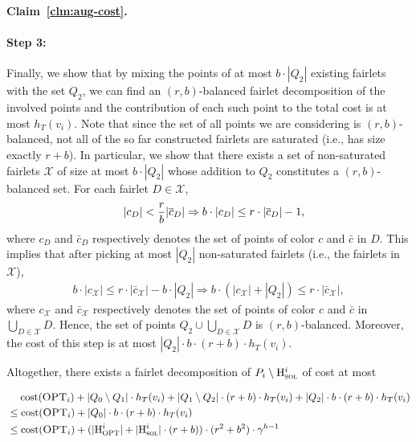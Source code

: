 \begin{proofof}{\bf Claim~\ref{clm:aug-cost}.}
\paragraph{Step 3:} Finally, we show that by mixing the points of at most $b\cdot|Q_2|$ existing fairlets with the set $Q_2$, we can find an $(r,b)$-balanced fairlet decomposition of the involved points and the contribution of each such point to the total cost is at most $h_T(v_i)$. Note that since the set of all points we are considering is $(r,b)$-balanced, not all of the so far constructed fairlets are saturated (i.e., has size exactly $r+b$). In particular, we show that there exists a set of non-saturated fairlets $\mathcal{X}$ of size at most $b\cdot |Q_2|$ whose addition to $Q_2$ constitutes a $(r,b)$-balanced set. For each fairlet $D\in \mathcal{X}$, 
\begin{align*}
\quad |c_{D}| < {r\over b} |\bar{c}_D|\Rightarrow b\cdot |c_D| \leq r\cdot |\bar{c}_D| - 1,
\end{align*}
where $c_D$ and $\bar{c}_D$ respectively denotes the set of points of color $c$ and $\bar{c}$ in $D$.
This implies that after picking at most $|Q_2|$ non-saturated fairlets (i.e., the fairlets in $\mathcal{X}$),
\begin{align*}
b\cdot |c_{\mathcal{X}}| \leq r\cdot |\bar{c}_{\mathcal{X}}| - b\cdot |Q_2| \Rightarrow b\cdot (|c_{\mathcal{X}}| + |Q_2|) \leq r\cdot |\bar{c}_{\mathcal{X}}|,
\end{align*}
where $c_{\mathcal{X}}$ and $\bar{c}_{\mathcal{X}}$ respectively denotes the set of points of color $c$ and $\bar{c}$ in $\bigcup_{D\in \mathcal{X}}D$.
Hence, the set of points $Q_2 \cup \bigcup_{D\in \mathcal{X}} D$ is $(r,b)$-balanced. Moreover, the cost of this step is at most $|Q_2|\cdot b \cdot (r+b) \cdot h_T(v_i)$. 

Altogether, there exists a fairlet decomposition of $P_i\setminus \heavy_{\sol}^i$ of cost at most 

\begin{align*}
&\quad\; \cost(\opt_i) + |Q_0\setminus Q_1| \cdot h_T(v_i) + |Q_1\setminus Q_2|\cdot (r+b) \cdot h_T(v_i) + |Q_2| \cdot b \cdot (r+b) \cdot h_T(v_i) \\
&\leq \cost(\opt_i) + |Q_0| \cdot b \cdot (r+b) \cdot h_T(v_i) \\ 
&\leq \cost(\opt_i) + (|\heavy^i _\opt| + |\heavy^i_\sol| \cdot (r+b)) \cdot (r^2 + b^2) \cdot \gamma^{h-1}
\end{align*}
\end{proofof}



